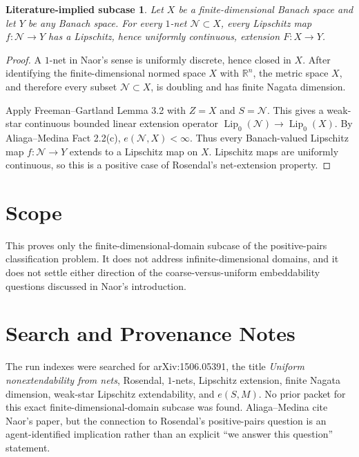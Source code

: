 \documentclass[11pt]{amsart}
\newtheorem*{theorem*}{Literature-implied subcase}
\begin{document}
\begin{theorem*}
Let \(X\) be a finite-dimensional Banach space and let \(Y\) be any Banach
space. For every \(1\)-net \(\mathscr N\subset X\), every Lipschitz map
\(f:\mathscr N\to Y\) has a Lipschitz, hence uniformly continuous, extension
\(F:X\to Y\).
\end{theorem*}

\begin{proof}
A \(1\)-net in Naor's sense is uniformly discrete, hence closed in \(X\).
After identifying the finite-dimensional normed space \(X\) with
\(\mathbb R^n\), the metric space \(X\), and therefore every subset
\(\mathscr N\subset X\), is doubling and has finite Nagata dimension.

Apply Freeman--Gartland Lemma 3.2 with \(Z=X\) and \(S=\mathscr N\). This
gives a weak-star continuous bounded linear extension operator
\(\operatorname{Lip}_0(\mathscr N)\to \operatorname{Lip}_0(X)\). By
Aliaga--Medina Fact 2.2(c), \(e(\mathscr N,X)<\infty\). Thus every
Banach-valued Lipschitz map \(f:\mathscr N\to Y\) extends to a Lipschitz map
on \(X\). Lipschitz maps are uniformly continuous, so this is a positive case
of Rosendal's net-extension property.
\end{proof}

\section*{Scope}

This proves only the finite-dimensional-domain subcase of the positive-pairs
classification problem. It does not address infinite-dimensional domains, and
it does not settle either direction of the coarse-versus-uniform embeddability
questions discussed in Naor's introduction.

\section*{Search and Provenance Notes}

The run indexes were searched for arXiv:1506.05391, the title
\emph{Uniform nonextendability from nets}, Rosendal, \(1\)-nets, Lipschitz
extension, finite Nagata dimension, weak-star Lipschitz extendability, and
\(e(S,M)\). No prior packet for this exact finite-dimensional-domain subcase
was found. Aliaga--Medina cite Naor's paper, but the connection to Rosendal's
positive-pairs question is an agent-identified implication rather than an
explicit ``we answer this question'' statement.
\end{document}
